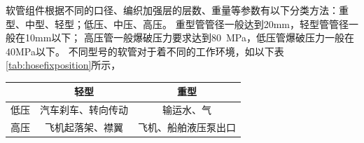 \begin{figure}[!htbp]
	\centering
	    \label{fig:plane-cruit}
	\hspace{1cm}
	    \label{fig:engine-cruit}
	  \label{fig:plane-hose}
\end{figure}





软管组件根据不同的口径、编织加强层的层数、重量等参数有以下分类方法：重型、中型、轻型；低压、中压、高压。
重型管管径一般达到20mm，轻型管管径一般在10mm以下；
高压管一般爆破压力要求达到\SI{80}{\mega\pascal}，低压管爆破压力一般在40MPa以下。
不同型号的软管对于着不同的工作环境，如以下表\ref{tab:hosefixposition}所示，




\begin{table}[!htbp]
	\centering
		
	\begin{tabular}{ccc}
		\toprule
		&    轻型     &     重型     \\ \hline
		低压 & 汽车刹车、转向传动 &  输运水、气  \\
		高压 & 飞机起落架、襟翼  & 飞机、船舶液压泵出口 \\ 
		\bottomrule
	\end{tabular} 
\end{table}


